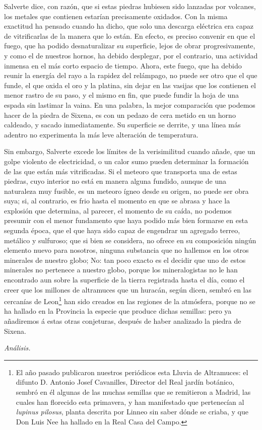 \documentclass[a4paper, 11pt, oneside, polutonikogreek, spanish]{article}
\begin{document}
Salverte dice, con razón, que si estas piedras hubiesen sido lanzadas por volcanes, los metales que contienen estarían precisamente oxidados. Con la misma exactitud ha pensado cuando ha dicho, que solo una descarga eléctrica era capaz de vitrificarlas de la manera que lo están. En efecto, es preciso convenir en que el fuego, que ha podido desnaturalizar su superficie, lejos de obrar progresivamente, y como el de nuestros hornos, ha debido desplegar, por el contrario, una actividad inmensa en el más corto espacio de tiempo. Ahora, este fuego, que ha debido reunir la energía del rayo a la rapidez del relámpago, no puede ser otro que el que funde, el que oxida el oro y la platina, sin dejar en las vasijas que los contienen el menor rastro de su paso, y el mismo en fin, que puede fundir la hoja de una espada sin lastimar la vaina. En una palabra, la mejor comparación que podemos hacer de la piedra de Sixena, es con un pedazo de cera metido en un horno caldeado, y sacado inmediatamente. Su superficie se derrite, y una línea más adentro no experimenta la más leve alteración de temperatura.

Sin embargo, Salverte excede los límites de la verisimilitud cuando añade, que un golpe violento de electricidad, o un calor sumo pueden determinar la formación de las que están más vitrificadas. Si el meteoro que transporta una de estas piedras, cuyo interior no está en manera alguna fundido, aunque de una naturaleza muy fusible, es un meteoro ígneo desde su origen, no puede ser obra suya; si, al contrario, es frio hasta el momento en que se abrasa y hace la explosión que determina, al parecer, el momento de su caída, no podemos presumir con el menor fundamento que haya podido más bien formarse en esta segunda época, que el que haya sido capaz de engendrar un agregado terreo, metálico y sulfuroso; que si bien se considera, no ofrece en su composición ningún elemento nuevo para nosotros, ninguna substancia que no hallemos en los otros minerales de nuestro globo; No: tan poco exacto es el decidir que uno de estos minerales no pertenece a nuestro globo, porque los mineralogistas no le han encontrado aun sobre la superficie de la tierra registrada hasta el día, como el creer que los millones de altramuces que un huracán, según dicen, sembró en las cercanías de Leon\footnote{El año pasado publicaron nuestros periódicos esta Lluvia de Altramuces: el difunto D. Antonio Josef Cavanilles, Director del Real jardín botánico, sembró en él algunas de las muchas semillas que se remitieron a Madrid, las cuales han florecido esta primavera, y han manifestado que pertenecían al \emph{lupinus pilosus}, planta descrita por Linneo sin saber dónde se criaba, y que Don Luis Nee ha hallado en la Real Casa del Campo.} han sido creados en las regiones de la atmósfera, porque no se ha hallado en la Provincia la especie que produce dichas semillas: pero ya añadiremos á estas otras conjeturas, después de haber analizado la piedra de Sixena.
\begin{center}
\emph{Análisis.}
\end{center}
\end{document}
